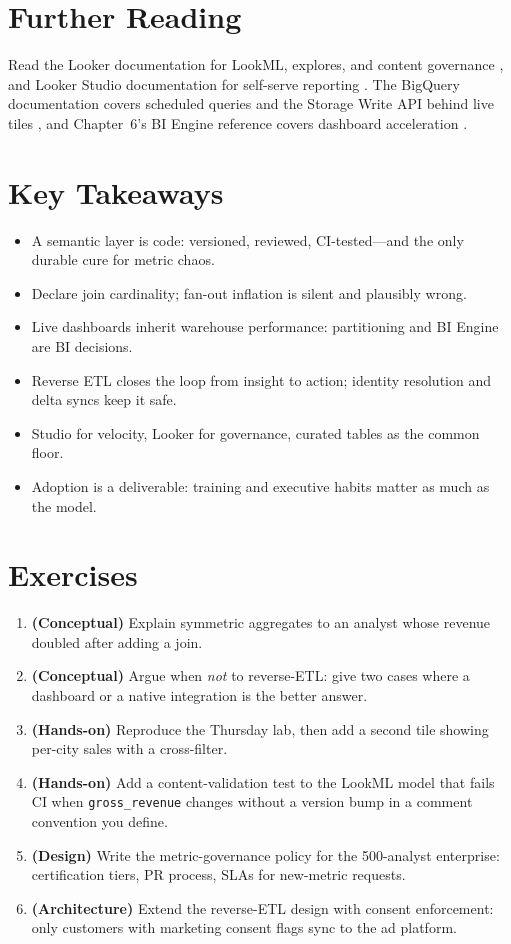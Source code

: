 \section{Further Reading}
Read the Looker documentation for LookML, explores, and content governance \cite{googlecloudlookerdocs}, and Looker Studio documentation for self-serve reporting \cite{googlecloudlookerstudio}. The BigQuery documentation covers scheduled queries and the Storage Write API behind live tiles \cite{googlecloudbigquerydocs}, and Chapter~6's BI Engine reference covers dashboard acceleration \cite{googlecloudbiengine}.

\section*{Key Takeaways}
\begin{itemize}
    \item A semantic layer is code: versioned, reviewed, CI-tested---and the only durable cure for metric chaos.
    \item Declare join cardinality; fan-out inflation is silent and plausibly wrong.
    \item Live dashboards inherit warehouse performance: partitioning and BI Engine are BI decisions.
    \item Reverse ETL closes the loop from insight to action; identity resolution and delta syncs keep it safe.
    \item Studio for velocity, Looker for governance, curated tables as the common floor.
    \item Adoption is a deliverable: training and executive habits matter as much as the model.
\end{itemize}

\section{Exercises}
\begin{enumerate}
    \item \textbf{(Conceptual)} Explain symmetric aggregates to an analyst whose revenue doubled after adding a join.
    \item \textbf{(Conceptual)} Argue when \emph{not} to reverse-ETL: give two cases where a dashboard or a native integration is the better answer.
    \item \textbf{(Hands-on)} Reproduce the Thursday lab, then add a second tile showing per-city sales with a cross-filter.
    \item \textbf{(Hands-on)} Add a content-validation test to the LookML model that fails CI when \texttt{gross\_revenue} changes without a version bump in a comment convention you define.
    \item \textbf{(Design)} Write the metric-governance policy for the 500-analyst enterprise: certification tiers, PR process, SLAs for new-metric requests.
    \item \textbf{(Architecture)} Extend the reverse-ETL design with consent enforcement: only customers with marketing consent flags sync to the ad platform.
\end{enumerate}

